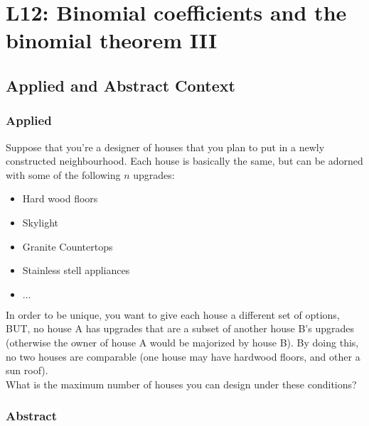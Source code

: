 \documentclass{report}
\begin{document}

\section{L12: Binomial coefficients and the binomial theorem III}

\subsection*{Applied and Abstract Context}

\subsubsection*{Applied}

Suppose that you're a designer of houses that you plan to put in a newly
constructed neighbourhood. Each house is basically the same, but can be adorned with
some of the following $n$ upgrades:

\begin{itemize}
    \item Hard wood floors
    \item Skylight
    \item Granite Countertops
    \item Stainless stell appliances
    \item $\dots$
\end{itemize}

\noindent
In order to be unique, you want to give each house a different set of options, BUT,
no house A has upgrades that are a subset of another house B's upgrades (otherwise
the owner of house A would be majorized by house B). By doing this, no two houses
are comparable (one house may have hardwood floors, and other a sun roof). \\

\noindent
What is the maximum number of houses you can design under these conditions?

\subsubsection*{Abstract}
\end{document}
